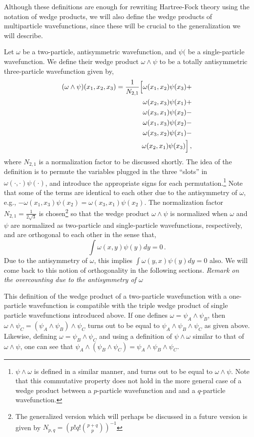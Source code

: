 \documentclass[11pt]{article}
\begin{document}
Although these definitions are enough for rewriting Hartree-Fock
theory using the notation of wedge products, we will also
define the wedge products of multiparticle wavefunctions, since these
will be crucial to the generalization we will describe.

Let $\omega$ be a two-particle, antisymmetric wavefunction, and $\psi($
be a single-particle wavefunction. We define their wedge product
$\omega \wedge \psi$ to be a totally antisymmetric three-particle
wavefunction given by,
\begin{eqnarray}
  (\omega \wedge \psi)(x_1, x_2, x_3) = \frac{1}{N_{2,1}} \Big[
\omega(x_1,x_2)\psi(x_3)+\cr
\omega(x_2,x_3)\psi(x_1)+\cr
\omega(x_3,x_1)\psi(x_2)-\cr
\omega(x_1,x_3)\psi(x_2)-\cr
\omega(x_3,x_2)\psi(x_1)-\cr
\omega(x_2,x_1)\psi(x_3)\Big] \,,
\end{eqnarray}
where $N_{2,1}$ is a normalization factor to be discussed shortly.
The idea of the definition is to permute the variables plugged in the three
``slots'' in $\omega(\cdot, \cdot)\psi(\cdot)$, and introduce the
appropriate signs for each permutation.\footnote{$\psi\wedge\omega$ is
  defined in a similar manner, and turns out to be equal to
  $\omega\wedge\psi$. Note that this commutative property does not
  hold in the more general case of a wedge product between a
  $p$-particle wavefunction and and a $q$-particle wavefunction.} 
Note that some of the terms
are identical to each other due to the antisymmetry of $\omega$, e.g.,
$-\omega(x_1,x_3)\psi(x_2) = \omega(x_3,x_1)\psi(x_2)$. The
normalization factor $N_{2,1} = \frac{1}{2\sqrt{3}}$ is 
chosen\footnote{The generalized version which will
  perhaps be discussed in a future version is given by
  $N_{p,q}=\left(p!q!{p+q\choose p}\right)^{-1}$} so that 
the wedge product $\omega\wedge\psi$ is
normalized when $\omega$ and
$\psi$ are normalized as two-particle and single-particle
wavefunctions, respectively, and are orthogonal to each other in the
sense that,
\begin{equation}
  \int \omega(x,y)\psi(y)dy = 0\,.
\end{equation}
Due to the antisymmetry of $\omega$, this implies $\int
\omega(y,x)\psi(y)dy=0$ also. We will come back to this notion of
orthogonality in the following sections. {\it Remark on the
  overcounting due to the antisymmetry of $\omega$}

This definition of the wedge product of a two-particle
wavefunction with a one-particle wavefunction is compatible with the
triple wedge product of single particle wavefunctions introduced above.
If one defines $\omega = \psi_A\wedge\psi_B$, then
$\omega \wedge \psi_C = (\psi_A\wedge\psi_B)\wedge\psi_C$
turns out to be equal to $\psi_A\wedge\psi_B\wedge\psi_C$ as given above.
Likewise, defining $\omega =
\psi_B\wedge\psi_C$ and using a definition of
$\psi\wedge\omega$ similar to that of $\omega\wedge\psi$, 
one can see that $\psi_A\wedge(\psi_B\wedge\psi_C) =
\psi_A\wedge\psi_B\wedge\psi_C$.
\end{document}
